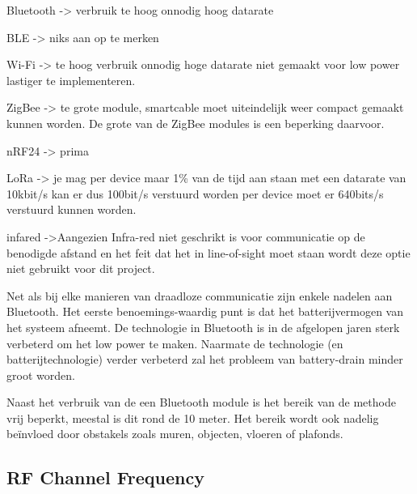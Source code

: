 \begin{table}[H]
	\centering
	\caption{Wireless module afwegingstabel}
	\label{tab:wisb_mod_wens}
\end{table}

Bluetooth -> verbruik te hoog onnodig hoog datarate

BLE -> niks aan op te merken

Wi-Fi -> te hoog verbruik onnodig hoge datarate niet gemaakt voor low power lastiger te implementeren.

ZigBee -> te grote module, smartcable moet uiteindelijk weer compact gemaakt kunnen worden. De grote van de ZigBee modules is een beperking daarvoor. 

nRF24 -> prima

LoRa -> je mag per device maar 1\% van de tijd aan staan met een datarate van 10kbit/s kan er dus 100bit/s verstuurd worden per device moet er 640bits/s verstuurd kunnen worden.

infared ->Aangezien Infra-red niet geschrikt is voor communicatie op de benodigde afstand en het feit dat het in line-of-sight moet staan wordt deze optie niet gebruikt voor dit project. 


Net als bij elke manieren van draadloze communicatie zijn enkele nadelen aan Bluetooth. Het eerste benoemings-waardig punt is dat het batterijvermogen van het systeem afneemt. De technologie in Bluetooth is in de afgelopen jaren sterk verbeterd om het low power te maken. Naarmate de technologie (en batterijtechnologie) verder verbeterd zal het probleem van battery-drain minder groot worden.

Naast het verbruik van de een Bluetooth module is het bereik van de methode vrij beperkt, meestal is dit rond de 10 meter. Het bereik wordt ook nadelig beïnvloed door obstakels zoals muren, objecten, vloeren of plafonds.

\subsection{RF Channel Frequency}

